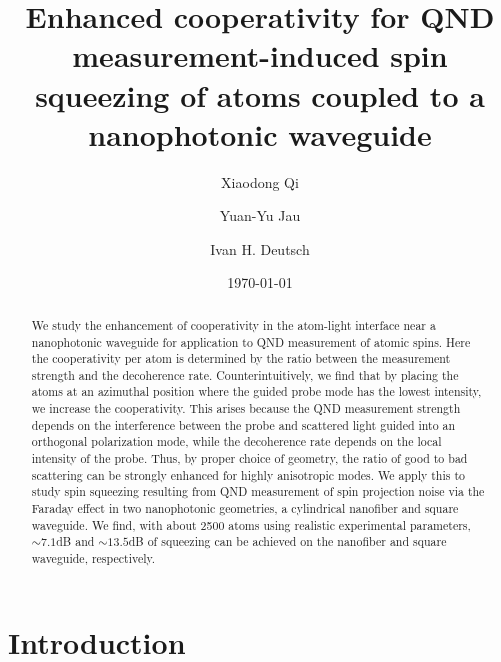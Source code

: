 \documentclass[preprint,aps,pra,onecolumn,superscriptaddress]{revtex4-1} %
\begin{document}
\title{Enhanced cooperativity for QND measurement-induced spin squeezing of atoms coupled to a nanophotonic waveguide}
\author{Xiaodong Qi}
\author{Yuan-Yu Jau}
\author{Ivan H. Deutsch}
\date{\today}

\begin{abstract}
We study the enhancement of cooperativity in the atom-light interface near a nanophotonic waveguide for application to QND measurement of atomic spins.  Here the cooperativity per atom is determined by the ratio between the  measurement strength and the decoherence rate.  Counterintuitively, we find that by placing the atoms at an azimuthal position where the guided probe mode has the lowest intensity, we increase the cooperativity.  This arises because the QND measurement strength depends on the interference between the probe and scattered light guided into an orthogonal polarization mode, while the decoherence rate depends on the local intensity of the probe.  Thus, by proper choice of geometry, the ratio of good to bad scattering can be strongly enhanced for highly anisotropic modes. We apply this to study spin squeezing resulting from QND measurement of spin projection noise via the Faraday effect in two nanophotonic geometries, a cylindrical nanofiber and square waveguide.  We find, with about 2500 atoms using realistic experimental parameters, $ \sim 7.1 $dB and $ \sim 13.5 $dB of squeezing can be achieved on the nanofiber and square waveguide, respectively. 
\end{abstract}

\maketitle

\section{Introduction}
\end{document}
